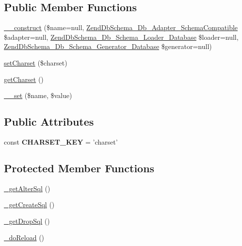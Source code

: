 \subsection*{Public Member Functions}
\begin{DoxyCompactItemize}
\item 
\hyperlink{classZendDbSchema__Db__Schema__Database_a922130cd70362866a2bd21d92131648e}{\-\_\-\-\_\-construct} (\$name=null, \hyperlink{interfaceZendDbSchema__Db__Adapter__SchemaCompatible}{Zend\-Db\-Schema\-\_\-\-Db\-\_\-\-Adapter\-\_\-\-Schema\-Compatible} \$adapter=null, \hyperlink{interfaceZendDbSchema__Db__Schema__Loader__Database}{Zend\-Db\-Schema\-\_\-\-Db\-\_\-\-Schema\-\_\-\-Loader\-\_\-\-Database} \$loader=null, \hyperlink{interfaceZendDbSchema__Db__Schema__Generator__Database}{Zend\-Db\-Schema\-\_\-\-Db\-\_\-\-Schema\-\_\-\-Generator\-\_\-\-Database} \$generator=null)
\item 
\hyperlink{classZendDbSchema__Db__Schema__Database_acfc530f3381e35f7d57676c4dcff3620}{set\-Charset} (\$charset)
\item 
\hyperlink{classZendDbSchema__Db__Schema__Database_a71126f98bb7da60fcd0ac00c101467c8}{get\-Charset} ()
\item 
\hyperlink{classZendDbSchema__Db__Schema__Database_a16cacd680a6a027a88ec41f6d8211982}{\-\_\-\-\_\-set} (\$name, \$value)
\end{DoxyCompactItemize}
\subsection*{Public Attributes}
\begin{DoxyCompactItemize}
\item 
\hypertarget{classZendDbSchema__Db__Schema__Database_a6259302bc5bb35945327c2a1539a3545}{const {\bfseries C\-H\-A\-R\-S\-E\-T\-\_\-\-K\-E\-Y} = 'charset'}\label{classZendDbSchema__Db__Schema__Database_a6259302bc5bb35945327c2a1539a3545}

\end{DoxyCompactItemize}
\subsection*{Protected Member Functions}
\begin{DoxyCompactItemize}
\item 
\hyperlink{classZendDbSchema__Db__Schema__Database_a4f5a636c4e7d8ab57f6e090cdf8841dc}{\-\_\-get\-Alter\-Sql} ()
\item 
\hyperlink{classZendDbSchema__Db__Schema__Database_a48ad6cd38cc07c3c350335d21d7c11e9}{\-\_\-get\-Create\-Sql} ()
\item 
\hyperlink{classZendDbSchema__Db__Schema__Database_ad0a851f47e7766bef9f0a54d01bffa6e}{\-\_\-get\-Drop\-Sql} ()
\item 
\hyperlink{classZendDbSchema__Db__Schema__Database_aad388b374fd5913946204230760b2d86}{\-\_\-do\-Reload} ()
\end{DoxyCompactItemize}

